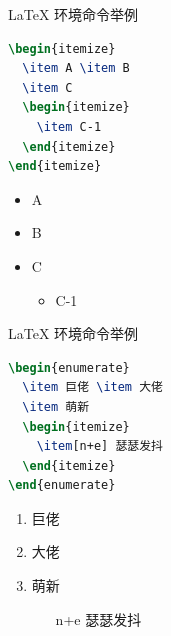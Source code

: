 \begin{frame}[fragile]{\LaTeX{} 环境命令举例}
	\begin{minipage}{0.5\linewidth}
		\begin{lstlisting}[language=TeX]
\begin{itemize}
  \item A \item B
  \item C
  \begin{itemize}
    \item C-1
  \end{itemize}
\end{itemize}
\end{lstlisting}
	\end{minipage}\hspace{1cm}
	\begin{minipage}{0.3\linewidth}
		\begin{itemize}
			\item A
			\item B
			\item C
			      \begin{itemize}
				      \item C-1
			      \end{itemize}
		\end{itemize}
	\end{minipage}

\end{frame}

\begin{frame}[fragile]{\LaTeX{} 环境命令举例}
	\begin{minipage}{0.5\linewidth}
		\begin{lstlisting}[language=TeX]
\begin{enumerate}
  \item 巨佬 \item 大佬
  \item 萌新
  \begin{itemize}
    \item[n+e] 瑟瑟发抖
  \end{itemize}
\end{enumerate}
\end{lstlisting}
	\end{minipage}\hspace{1cm}
	\begin{minipage}{0.3\linewidth}
		\begin{enumerate}
			\item 巨佬
			\item 大佬
			\item 萌新
			      \begin{itemize}
				      \item[n+e] 瑟瑟发抖
			      \end{itemize}
		\end{enumerate}
	\end{minipage}

\end{frame}

